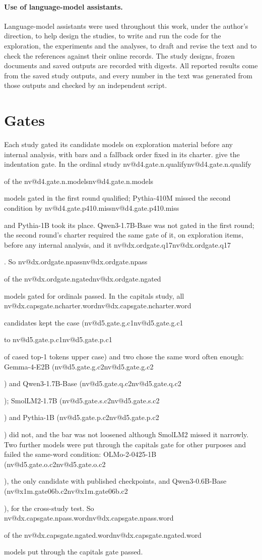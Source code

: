 \documentclass[11pt]{article}
\makeatletter
\newcommand{\nv}[1]{\ifcsname nv@#1\endcsname\csname nv@#1\endcsname\else\PackageError{numbers}{Unknown number key #1}{}\fi}
\newcommand{\qsix}{Qwen3-0.6B-Base}
\newcommand{\qbig}{Qwen3-1.7B-Base}
\newcommand{\olmo}{OLMo-2-0425-1B}
\newcommand{\gm}{Gemma-4-E2B}
\makeatother
\begin{document}
\paragraph{Use of language-model assistants.} Language-model assistants were used throughout this work, under the author's direction, to help design the studies, to write and run the code for the exploration, the experiments and the analyses, to draft and revise the text and to check the references against their online records. The study designs, frozen documents and saved outputs are recorded with digests. All reported results come from the saved study outputs, and every number in the text was generated from those outputs and checked by an independent script.

\label{dx:refstart}
{\small\raggedright


}
\label{dx:refend}

\appendix
{}

\section{Gates}
\label{app:gates}

Each study gated its candidate models on exploration material before any internal analysis, with bars and a fallback order fixed in its charter.  give the indentation gate. In the ordinal study \nv{d4.gate.n.qualify} of the \nv{d4.gate.n.models} models gated in the first round qualified; Pythia-410M missed the second condition by \nv{d4.gate.p410.miss} and Pythia-1B took its place. \qbig{} was not gated in the first round; the second round's charter required the same gate of it, on exploration items, before any internal analysis, and it \nv{dx.ordgate.q17}. So \nv{dx.ordgate.npass} of the \nv{dx.ordgate.ngated} models gated for ordinals passed. In the capitals study, all \nv{dx.capsgate.ncharter.word} candidates kept the case (\nv{d5.gate.g.c1} to \nv{d5.gate.p.c1} of cased top-1 tokens upper case) and two chose the same word often enough: \gm{} (\nv{d5.gate.g.c2}) and \qbig{} (\nv{d5.gate.q.c2}); SmolLM2-1.7B (\nv{d5.gate.s.c2}) and Pythia-1B (\nv{d5.gate.p.c2}) did not, and the bar was not loosened although SmolLM2 missed it narrowly. Two further models were put through the capitals gate for other purposes and failed the same-word condition: \olmo{} (\nv{d5.gate.o.c2}), the only candidate with published checkpoints, and \qsix{} (\nv{x1m.gate06b.c2}), for the cross-study test. So \nv{dx.capsgate.npass.word} of the \nv{dx.capsgate.ngated.word} models put through the capitals gate passed.
\end{document}
